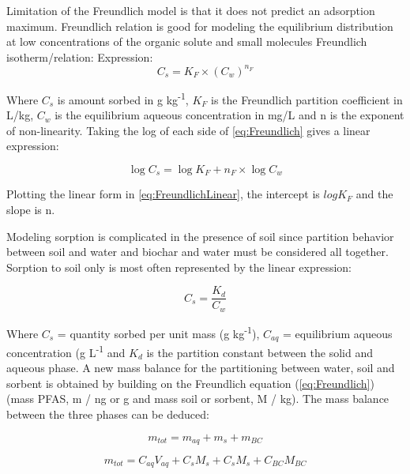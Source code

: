 Limitation of the Freundlich model is that it does not predict an adsorption maximum. 
Freundlich relation is good for modeling the equilibrium distribution at low concentrations of the organic solute and small molecules \citep{vanloon2017Ch14}
Freundlich isotherm/relation: 
Expression:
\begin{equation} \label{eq:Freundlich}
    C_s = K_F \times (C_{w})^{n_F}
\end{equation}

Where $C_s$ is amount sorbed in \textmu g kg\textsuperscript{-1}, $K_F$ is the Freundlich partition coefficient in L/kg, $C_{w}$ is the equilibrium aqueous concentration in mg/L and n is the exponent of non-linearity. Taking the log of each side of \cref{eq:Freundlich} gives a linear expression:

\begin{equation} \label{eq:FreundlichLinear}
    \log C_s = \log K_F + n_F \times \log C_{w}
\end{equation}

Plotting the linear form in \cref{eq:FreundlichLinear}, the intercept is $log K_F$ and the slope is n. 

Modeling sorption is complicated in the presence of soil since partition behavior between soil and water and biochar and water must be considered all together. Sorption to soil only is most often represented by the linear expression:

\begin{equation} \label{eq:KD}
    C_s = \frac{K_d}{C_{w}}
\end{equation}

Where $C_s$ = quantity sorbed per unit mass (\textmu g kg\textsuperscript{-1}), $C_{aq}$ =  equilibrium aqueous concentration (\textmu g L\textsuperscript{-1} and $K_d$ is the partition constant between the solid and aqueous phase. A new mass balance for the partitioning between water, soil and sorbent is obtained by building on the Freundlich equation (\cref{eq:Freundlich}) (mass PFAS, m / ng or \textmu g and mass soil or sorbent, M / kg). The mass balance between the three phases can be deduced:

\begin{equation} \label{eq:massBalance1}
    m_{tot} = m_{aq} + m_{s} + m_{BC}
\end{equation}

\begin{equation} \label{eq:massBalance2}
     m_{tot} = C_{aq}V_{aq} + C_sM_s + C_sM_s + C_{BC}M_{BC}
\end{equation}

